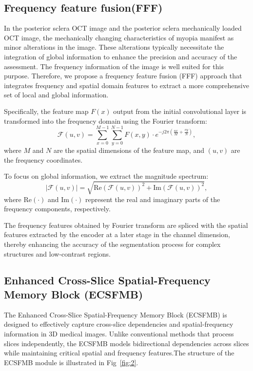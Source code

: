 \documentclass[AMA,Times1COL]{WileyNJDv5} %
\begin{document}
\subsection{Frequency feature fusion(FFF)}
In the posterior sclera OCT image and the posterior sclera mechanically loaded OCT image, the mechanically changing characteristics of myopia manifest as minor alterations in the image. These alterations typically necessitate the integration of global information to enhance the precision and accuracy of the assessment. The frequency information of the image is well suited for this purpose. Therefore, we propose a frequency feature fusion (FFF) approach that integrates frequency and spatial domain features to extract a more comprehensive set of local and global information.

Specifically, the feature map \( F(x) \) output from the initial convolutional layer is transformed into the frequency domain using the Fourier transform:
\begin{equation}
\mathcal{F}(u, v) = \sum_{x=0}^{M-1} \sum_{y=0}^{N-1} F(x, y) \cdot e^{-j2\pi\left(\frac{ux}{M} + \frac{vy}{N}\right)},
\end{equation}
where \( M \) and \( N \) are the spatial dimensions of the feature map, and \((u, v)\) are the frequency coordinates.

To focus on global information, we extract the magnitude spectrum:
\begin{equation}
|\mathcal{F}(u, v)| = \sqrt{\text{Re}(\mathcal{F}(u, v))^2 + \text{Im}(\mathcal{F}(u, v))^2},
\end{equation}
where \( \text{Re}(\cdot) \) and \( \text{Im}(\cdot) \) represent the real and imaginary parts of the frequency components, respectively.

The frequency features obtained by Fourier transform are spliced with the spatial features extracted by the encoder at a later stage in the channel dimension, thereby enhancing the accuracy of the segmentation process for complex structures and low-contrast regions.

\subsection{Enhanced Cross-Slice Spatial-Frequency Memory Block (ECSFMB)}
The Enhanced Cross-Slice Spatial-Frequency Memory Block (ECSFMB) is designed to effectively capture cross-slice dependencies and spatial-frequency information in 3D medical images. Unlike conventional methods that process slices independently, the ECSFMB models bidirectional dependencies across slices while maintaining critical spatial and frequency features.The structure of the ECSFMB module is illustrated in Fig~\ref{fig:2}.
\end{document}
